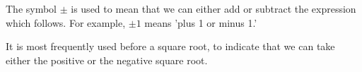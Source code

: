 The symbol $ \pm $ is used to mean that we can either add or subtract the
expression which follows. For example, $ \pm 1 $ means 'plus 1 or minus 1.'
\par
It is most frequently used before a square root, to indicate
that we can take either the positive or the negative square root.